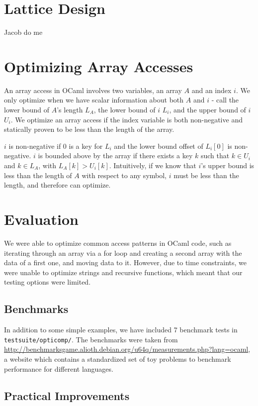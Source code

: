 \documentclass[11pt]{article}
\begin{document}
\section{Lattice Design}

Jacob do me

\section{Optimizing Array Accesses}

An array access in OCaml involves two variables, an array $A$ and an index $i$. We only optimize when we have scalar information about both $A$ and $i$ - call the lower bound of $A$'s length $L_A$, the lower bound of $i$ $L_i$, and the upper bound of $i$ $U_i$. We optimize an array access if the index variable is both non-negative and statically proven to be less than the length of the array.

$i$ is non-negative if $0$ is a key for $L_i$ and the lower bound offset of $L_i[0]$ is non-negative. $i$ is bounded above by the array if there exists a key $k$ such that $k \in U_i$ and $k \in L_A$, with $L_A[k] > U_i[k]$. Intuitively, if we know that $i$'s upper bound is less than the length of $A$ with respect to any symbol, $i$ must be less than the length, and therefore can optimize.


\section{Evaluation}

We were able to optimize common access patterns in OCaml code, such as iterating through an array via a for loop and creating a second array with the data of a first one, and moving data to it. However, due to time constraints, we were unable to optimize strings and recursive functions, which meant that our testing options were limited.

\subsection{Benchmarks}

In addition to some simple examples, we have included 7 benchmark tests in \verb|testsuite/opticomp/|. The benchmarks were taken from \url{http://benchmarksgame.alioth.debian.org/u64q/measurements.php?lang=ocaml}, a website which contains a standardized set of toy problems to benchmark performance for different languages.

\subsection{Practical Improvements}
\end{document}
